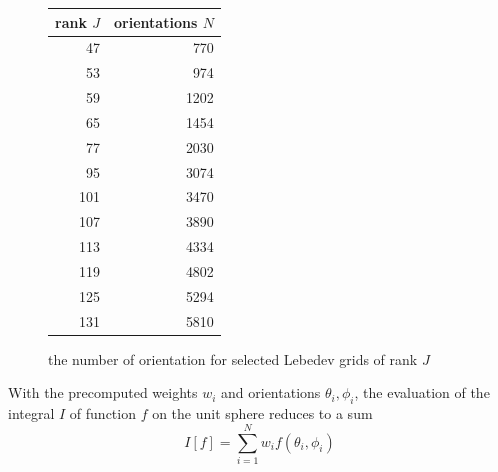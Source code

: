 \documentclass[11.5pt,a4paper]{article}
\begin{document}
\begin{figure}
  \begin{center}
 \begin{tabular}{|r|r|}
  \hline
  rank $J$	& orientations $N$ \\
  \hline
  47		& 770 \\
  53		& 974 \\
  59		& 1202 \\
  65		& 1454 \\
  77		& 2030 \\
  95		& 3074 \\
  101		& 3470 \\
  107		& 3890 \\
  113		& 4334 \\
  119		& 4802 \\
  125		& 5294 \\
  131		& 5810 \\
  \hline
 \end{tabular}
\caption{the number of orientation for selected Lebedev grids of rank $J$}
\label{tab-lebedev}
  \end{center}
\end{figure}
With the precomputed weights $w_i$ and orientations $\theta_i, \phi_i$, the evaluation of the integral $I$ of function $f$ on the unit sphere reduces to a sum
\begin{equation}
 I[f] = \sum_{i=1}^N w_i f(\theta_i,\phi_i)
\end{equation}
\end{document}
